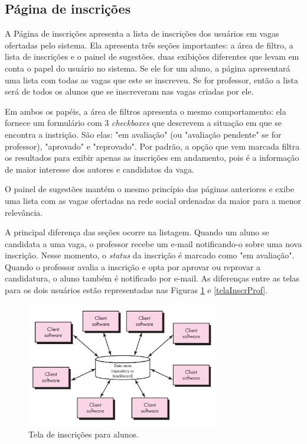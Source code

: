 \documentclass[cic,tc]{iiufrgs}
\begin{document}
\subsection{Página de inscrições}
\label{PDVFunInscricoes}

A Página de inscrições apresenta a lista de inscrições dos usuários em vagas ofertadas pelo sistema. Ela apresenta três seções importantes: a área de filtro, a lista de inscrições e o painel de sugestões. duas exibições diferentes que levam em conta o papel do usuário no sistema. Se ele for um aluno, a página apresentará uma lista com todas as vagas que este se inscreveu. Se for professor, então a lista será de todos os alunos que se inscreveram nas vagas criadas por ele.

Em ambos os papéis, a área de filtros apresenta o mesmo comportamento: ela fornece um formulário com 3 \textit{checkboxes} que descrevem a situação em que se encontra a instrição. São elas: "em avaliação" (ou "avaliação pendente" se for professor), "aprovado" e "reprovado". Por padrão, a opção que vem marcada filtra os resultados para exibir apenas as inscrições em andamento, pois é a informação de maior interesse dos autores e candidatos da vaga.

O painel de sugestões mantém o mesmo princípio das páginas anteriores e exibe uma lista com as vagas ofertadas na rede social ordenadas da maior para a menor relevância.

A principal diferença das seções ocorre na listagem. Quando um aluno se candidata a uma vaga, o professor recebe um e-mail notificando-o sobre uma nova inscrição. Nesse momento, o \textit{status} da inscrição é marcado como "em avaliação". Quando o professor avalia a inscrição e opta por aprovar ou reprovar a candidatura, o aluno também é notificado por e-mail. As diferenças entre as telas para os dois usuários estão representadas nas Figuras \ref{telaInscrAluno} e \ref{telaInscrProf}.

\begin{figure}[h]
    \caption{Tela de inscrições para alunos.}
        \begin{center}
            \includegraphics[width=0.75\textwidth]{figuras/arquitetura-centralizada-dados.png}
        \end{center}
    \label{telaInscrAluno}
\end{figure}
\end{document}
